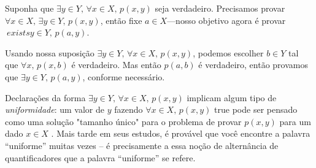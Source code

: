 \begin{cproof}
Suponha que $\exists y \in Y,\, \forall x \in X,\, p(x,y)$ seja verdadeiro. Precisamos provar $\forall x \in X,\, \exists y \in Y,\, p(x,y)$, então fixe $a \in X$---nosso objetivo agora é provar $\ exists y \in Y,\, p(a,y)$.

Usando nossa suposição $\exists y \in Y,\, \forall x \in X,\, p(x,y)$, podemos escolher $b \in Y$ tal que $\forall x,\, p( x,b)$ é verdadeiro. Mas então $p(a, b)$ é verdadeiro, então provamos que $\exists y \in Y,\, p(a,y)$, conforme necessário.
\end{cproof}

Declarações da forma $\exists y \in Y,\, \forall x \in X,\, p(x,y)$ implicam algum tipo de \textit{uniformidade}: um valor de $y$ fazendo $\forall x \in X,\, p(x,y)$ true pode ser pensado como uma solução "tamanho único" para o problema de provar $p(x,y)$ para um dado $x \in X$ . Mais tarde em seus estudos, é provável que você encontre a palavra “uniforme” muitas vezes – é precisamente a essa noção de alternância de quantificadores que a palavra “uniforme” se refere.
